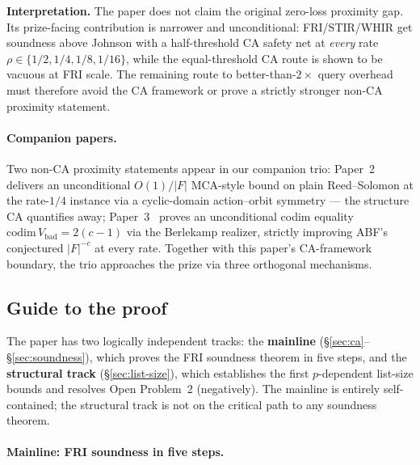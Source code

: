 \documentclass[11pt]{article}
\begin{document}
\textbf{Interpretation.} The paper does not claim the original zero-loss proximity gap. Its prize-facing contribution is narrower and unconditional: FRI/STIR/WHIR get soundness above Johnson with a half-threshold CA safety net at \emph{every} rate $\rho \in \{1/2, 1/4, 1/8, 1/16\}$, while the equal-threshold CA route is shown to be vacuous at FRI scale. The remaining route to better-than-$2\times$ query overhead must therefore avoid the CA framework or prove a strictly stronger non-CA proximity statement.

\paragraph{Companion papers.} Two non-CA proximity statements appear in our companion trio: Paper~2~\cite{Paper2Companion} delivers an unconditional $O(1)/|F|$ MCA-style bound on plain Reed--Solomon at the rate-$1/4$ instance via a cyclic-domain action--orbit symmetry --- the structure CA quantifies away; Paper~3~\cite{Paper3Companion} proves an unconditional codim equality $\mathrm{codim}\, V_{\mathrm{bad}} = 2(c-1)$ via the Berlekamp realizer, strictly improving ABF's conjectured $|F|^{-c}$ at every rate. Together with this paper's CA-framework boundary, the trio approaches the prize via three orthogonal mechanisms.

\subsection{Guide to the proof}
\label{sec:guide}

The paper has two logically independent tracks: the \textbf{mainline} (\S\ref{sec:ca}--\S\ref{sec:soundness}), which proves the FRI soundness theorem in five steps, and the \textbf{structural track} (\S\ref{sec:list-size}), which establishes the first $p$-dependent list-size bounds and resolves Open Problem~2 (negatively). The mainline is entirely self-contained; the structural track is not on the critical path to any soundness theorem.

\paragraph{Mainline: FRI soundness in five steps.}
\end{document}
